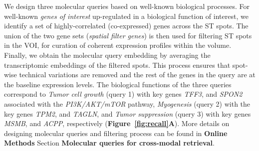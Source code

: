 We design three molecular queries based on well-known biological processes. For well-known \textit{genes of interest} up-regulated in a biological function of interest, we identify a set of highly-correlated (co-expressed) genes across the ST spots. The union of the two gene sets (\textit{spatial filter genes}) is then used for filtering ST spots in the VOI, for curation of coherent expression profiles within the volume. Finally, we obtain the molecular query embedding by averaging the transcriptomic embeddings of the filtered spots.
This process ensures that spot-wise technical variations are removed and the rest of the genes in the query are at the baseline expression levels. 
The biological functions of the three queries correspond to \textit{Tumor cell growth} (query 1) with key genes \textit{TFF3}, and \textit{SPON2} associated with the \textit{PI3K/AKT/mTOR} pathway\cite{liu2018overexpression,zhang2024biological}, \textit{Myogenesis}\cite{liberzon2015molecular, ma2023prostate} (query 2) with the key genes \textit{TPM2}, and \textit{TAGLN}, and \textit{Tumor suppression} (query 3) with key genes \textit{MSMB}\cite{sjoblom2016microseminoprotein}, and \textit{ACPP}\cite{veeramani2005cellular}, respectively (\textbf{Figure~\ref{fig:recall}A}). More details on designing molecular queries and filtering process can be found in \textbf{Online Methods} Section \textbf{Molecular queries for cross-modal retrieval}.

